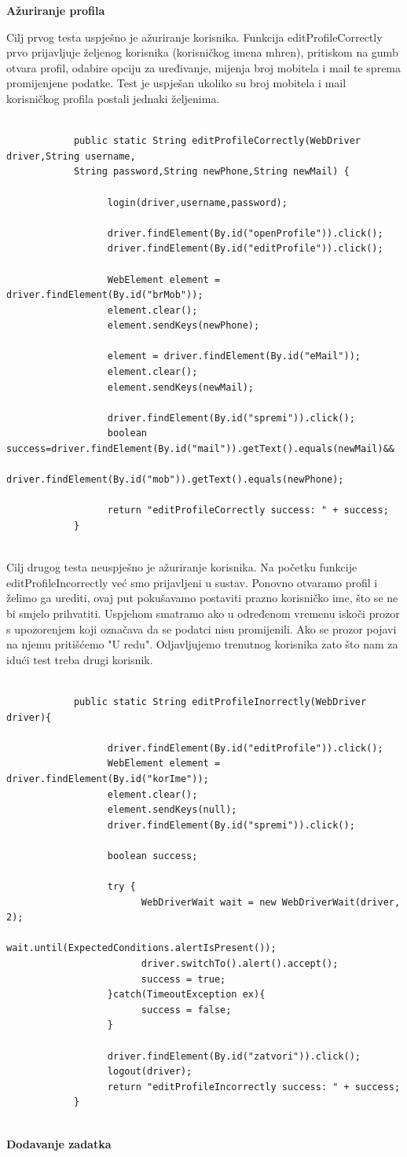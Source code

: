 		\textbf{Ažuriranje profila}
		
		Cilj prvog testa uspješno je ažuriranje korisnika. Funkcija editProfileCorrectly prvo prijavljuje željenog korisnika (korisničkog imena mhren), pritiskom na gumb otvara profil, odabire opciju za uređivanje, mijenja broj mobitela i mail te sprema promijenjene podatke. Test je uspješan ukoliko su broj mobitela i mail korisničkog profila postali jednaki željenima.
		\begin{verbatim}
			
			public static String editProfileCorrectly(WebDriver driver,String username,
			String password,String newPhone,String newMail) {
				
				  login(driver,username,password);
				
				  driver.findElement(By.id("openProfile")).click();
				  driver.findElement(By.id("editProfile")).click();
				
				  WebElement element = driver.findElement(By.id("brMob"));
				  element.clear();
				  element.sendKeys(newPhone);
				
				  element = driver.findElement(By.id("eMail"));
				  element.clear();
				  element.sendKeys(newMail);
				
				  driver.findElement(By.id("spremi")).click();
				  boolean success=driver.findElement(By.id("mail")).getText().equals(newMail)&&
				  driver.findElement(By.id("mob")).getText().equals(newPhone);
				
				  return "editProfileCorrectly success: " + success;
			}
			
		\end{verbatim}
		Cilj drugog testa neuspješno je ažuriranje korisnika. Na početku funkcije editProfileIncorrectly već smo prijavljeni u sustav. Ponovno otvaramo profil i želimo ga urediti, ovaj 
		put pokušavamo postaviti prazno korisničko ime, što se ne bi smjelo prihvatiti. Uspjehom smatramo ako u određenom vremenu iskoči prozor s upozorenjem koji označava da se podatci nisu promijenili. Ako se prozor pojavi na njemu pritišćemo "U redu". Odjavljujemo trenutnog korisnika zato što nam za idući test treba drugi korisnik.
		\begin{verbatim}
			
			public static String editProfileInorrectly(WebDriver driver){
				  
				  driver.findElement(By.id("editProfile")).click();
				  WebElement element = driver.findElement(By.id("korIme"));
				  element.clear();
				  element.sendKeys(null);
				  driver.findElement(By.id("spremi")).click();
				
				  boolean success;
				
				  try {
					    WebDriverWait wait = new WebDriverWait(driver, 2);
					    wait.until(ExpectedConditions.alertIsPresent());
					    driver.switchTo().alert().accept();
					    success = true;
				  }catch(TimeoutException ex){
					    success = false;
				  }
				
				  driver.findElement(By.id("zatvori")).click();
				  logout(driver);
				  return "editProfileIncorrectly success: " + success;
			}
			
		\end{verbatim}
		\textbf{Dodavanje zadatka}
		
